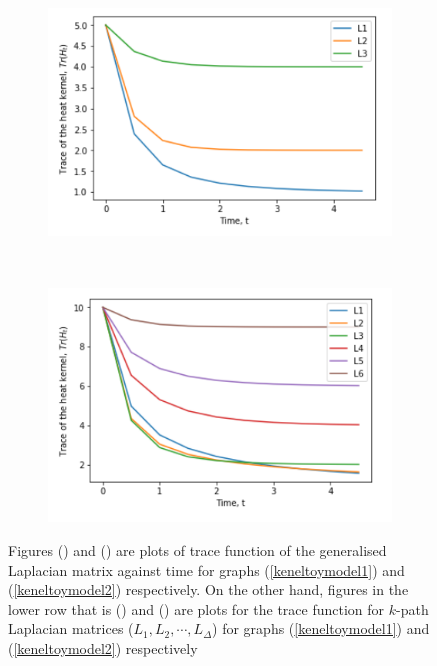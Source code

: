 \documentclass[10pt,a4paper]{article}
\begin{document}
		   \begin{figure}[H]
		    \begin{subfigure}[b]{0.45\textwidth}
		    	\includegraphics[width= \textwidth]{images/model-1-klap.png}
		    	\caption{}
		    	\label{model1-kpath}
		    \end{subfigure}~
		    \begin{subfigure}[b]{0.45\textwidth}
		    	\includegraphics[width= \textwidth]{images/model-2-klap.png}
		    	\caption{}
		    	\label{model2-kpath}
		    \end{subfigure}
			\caption{Figures () and () are plots of trace function of the generalised Laplacian matrix against time for graphs (\ref{keneltoymodel1}) and (\ref{keneltoymodel2}) respectively. On the other hand, figures in the lower row that is () and () are plots for the trace function for $k$-path Laplacian matrices ($L_1, L_2,\cdots, L_{\Delta}$) for graphs (\ref{keneltoymodel1}) and (\ref{keneltoymodel2}) respectively  }
			\label{}
		\end{figure}
\end{document}
